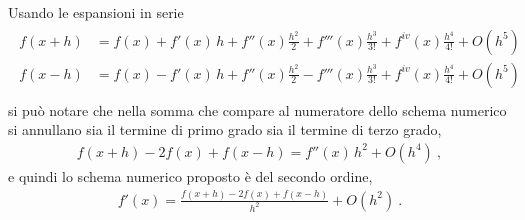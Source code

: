 \documentclass[letterpaper,10pt,english]{jupyterBook}
\begin{document}
\sphinxAtStartPar
Usando le espansioni in serie
\begin{equation*}
\begin{split}\begin{aligned}
  f(x + h) & = f(x) + f'(x) \, h + f''(x) \frac{h^2}{2} + f'''(x) \frac{h^3}{3!} + f^{iv}(x) \frac{h^4}{4!} + O(h^5) \\ f(x - h) & = f(x) - f'(x) \, h + f''(x) \frac{h^2}{2} - f'''(x) \frac{h^3}{3!} + f^{iv}(x) \frac{h^4}{4!} + O(h^5) \\
\end{aligned}\end{split}
\end{equation*}
\sphinxAtStartPar
si può notare che nella somma che compare al numeratore dello schema numerico si annullano sia il termine di primo grado sia il termine di terzo grado,
\begin{equation*}
\begin{split}
 f(x+h) - 2 f(x) + f(x-h) = f''(x) \, h^2 + O(h^4) \ ,
\end{split}
\end{equation*}
\sphinxAtStartPar
e quindi lo schema numerico proposto è del secondo ordine,
\begin{equation*}
\begin{split}f'(x) = \frac{ f(x+h) - 2 f(x) + f(x-h) }{h^2} + O(h^2) \ .\end{split}
\end{equation*}
\end{document}
